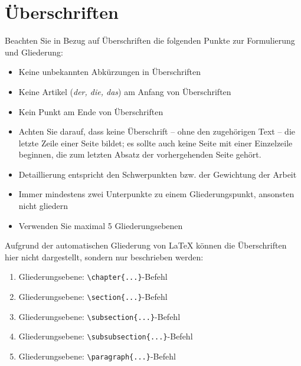 \section{Überschriften}
Beachten Sie in Bezug auf Überschriften die folgenden Punkte zur Formulierung und Gliederung:
\begin{itemize}
	\item Keine unbekannten Abkürzungen in Überschriften
	\item Keine Artikel (\textit{der, die, das}) am Anfang von Überschriften
	\item Kein Punkt am Ende von Überschriften
	\item Achten Sie darauf, dass keine Überschrift – ohne den zugehörigen Text – die letzte Zeile einer Seite bildet; es sollte auch keine Seite mit einer Einzelzeile beginnen, die zum letzten Absatz der vorhergehenden Seite gehört.
	\item Detaillierung entspricht den Schwerpunkten bzw. der Gewichtung der Arbeit
	\item Immer mindestens zwei Unterpunkte zu einem Gliederungspunkt, ansonsten nicht gliedern
	\item Verwenden Sie maximal 5 Gliederungsebenen	
\end{itemize}
Aufgrund der automatischen Gliederung von {\LaTeX} können die Überschriften hier nicht dargestellt, sondern nur beschrieben werden:
\begin{enumerate}
	\item	Gliederungsebene: \verb|\chapter{...}|-Befehl
	\item	Gliederungsebene: \verb|\section{...}|-Befehl
	\item	Gliederungsebene: \verb|\subsection{...}|-Befehl
	\item	Gliederungsebene: \verb|\subsubsection{...}|-Befehl
	\item	Gliederungsebene: \verb|\paragraph{...}|-Befehl
\end{enumerate}

